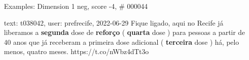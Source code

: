 \begin{frame}{Examples: Dimension 1 neg, score -4, \# 000044}
\footnotesize
\begin{alertblock}{text: t038042, user: prefrecife, 2022-06-29}
Fique ligado, aqui no Recife já liberamos a \textbf{segunda} dose de 
\textbf{reforço} ( \textbf{quarta} dose ) para pessoas a partir de 40 anos que 
já receberam a primeira dose adicional ( \textbf{terceira} dose ) há, pelo 
menos, quatro meses. https://t.co/nWbz4dTt3o 
\end{alertblock}
\end{frame}
